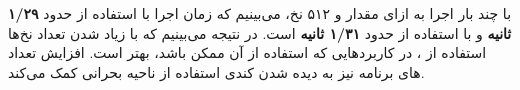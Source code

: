 \documentclass{HW}
\begin{document}
\begin{question}
با چند بار اجرا به ازای مقدار  و ۵۱۲ نخ، می‌بینیم که زمان اجرا با استفاده از  حدود
\textbf{۱/۲۹ ثانیه}
و با استفاده از  حدود
\textbf{۱/۳۱ ثانیه}
است. در نتیجه می‌بینیم که با زیاد شدن تعداد نخ‌ها استفاده از ، در کاربردهایی که استفاده از آن ممکن باشد، بهتر است. افزایش تعداد های برنامه نیز به دیده شدن کندی استفاده از ناحیه بحرانی کمک می‌کند.
\end{question}
\end{document}
